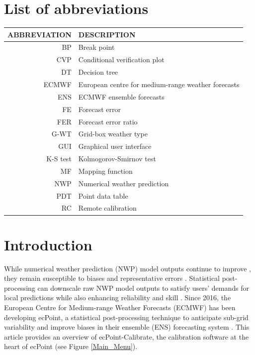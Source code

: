 \documentclass[techmemo]{ecmwfrep}%
\begin{document}
\section*{List of abbreviations}

\begin{tabular}{r l}
\hline
ABBREVIATION & DESCRIPTION \\
\hline
BP & Break point \\
CVP & Conditional verification plot \\
DT & Decision tree \\
ECMWF & European centre for medium-range weather forecasts \\
ENS & ECMWF ensemble forecasts \\
FE & Forecast error \\
FER & Forecast error ratio \\
G-WT & Grid-box weather type \\
GUI & Graphical user interface \\
K-S test & Kolmogorov-Smirnov test \\
MF & Mapping function \\
NWP & Numerical weather prediction \\
PDT & Point data table \\
RC & Remote calibration \\
\end{tabular}

\section{Introduction}

While numerical weather prediction (NWP) model outputs continue to improve \citep{Bauer2015, Bauer2021}, they remain susceptible to biases \citep{Lavers2021} and representative errors \citep{Haiden2018}. Statistical post-processing can downscale raw NWP model outputs to satisfy users’ demands for local predictions while also enhancing reliability and skill \citep{Wilks2019}. Since 2016, the European Centre for Medium-range Weather Forecasts (ECMWF) has been developing ecPoint, a statistical post-processing technique to anticipate sub-grid variability and improve biases in their ensemble (ENS) forecasting system \citep{Hewson2021}. This article provides an overview of ecPoint-Calibrate, the calibration software at the heart of ecPoint (see Figure \label{Main_Menu} \ref{Main_Menu}).
\end{document}
